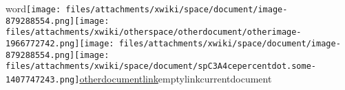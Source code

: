 \documentclass{article}
\begin{document}
word\texttt{[image: files/attachments/xwiki/space/document/image-879288554.png]}\texttt{[image: files/attachments/xwiki/otherspace/otherdocument/otherimage-1966772742.png]}\texttt{[image: files/attachments/xwiki/space/document/image-879288554.png]}\texttt{[image: files/attachments/xwiki/space/document/spC3A4cepercentdot.some-1407747243.png]}\href{http://test/bin/view/OtherSpace/OtherDocument}{otherdocumentlink}emptylinkcurrentdocument
\end{document}
